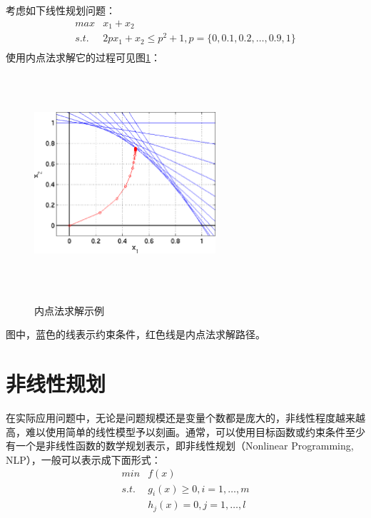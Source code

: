 \begin{example}
考虑如下线性规划问题：
\begin{equation}
  \begin{array}{ll}
  \textit{max} & x_1 + x_2 \\
  \textit{s.t.} & 2px_1 + x_2 \le p^2 + 1, p = \{0, 0.1, 0.2, \ldots, 0.9, 1\}\\
  \end{array}
\end{equation}
使用内点法求解它的过程可见图\ref{fig:karmarkar}：
\begin{figure}[htbp]
  \centering
  \includegraphics[width=0.6\textwidth, height=8cm]{figures/Karmarkar.eps}\\
  \caption{内点法求解示例}\label{fig:karmarkar}
\end{figure}
图中，蓝色的线表示约束条件，红色线是内点法求解路径。
\end{example}

\section{非线性规划}
在实际应用问题中，无论是问题规模还是变量个数都是庞大的，非线性程度越来越高，难以使用简单的线性模型予以刻画。通常，可以使用目标函数或约束条件至少有一个是非线性函数的数学规划表示，即非线性规划（Nonlinear Programming, NLP），一般可以表示成下面形式：
\begin{equation}\label{eq:nlpproblem}
    \begin{array}{lll}
      \textit{min} & f(x) \\
      \textit{s.t.} & g_i(x) \ge 0, i = 1, \ldots, m\\
       & h_j(x) = 0, j = 1,\ldots, l
    \end{array}
\end{equation}

